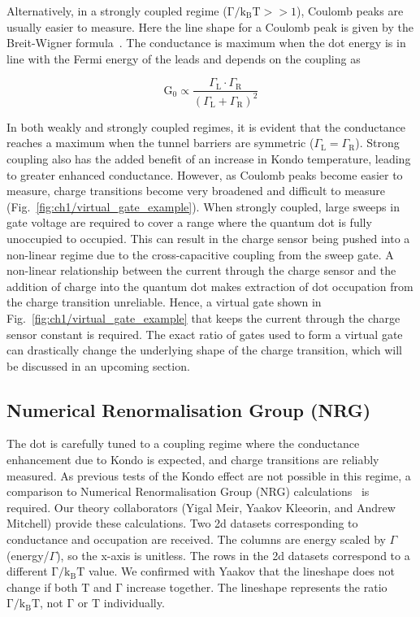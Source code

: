 Alternatively, in a strongly coupled regime ($\mathrm{\Gamma/k_BT}>>1$), Coulomb peaks are usually easier to measure. Here the line shape for a Coulomb peak is given by the Breit-Wigner formula~\cite{Breit1936}. The conductance is maximum when the dot energy is in line with the Fermi energy of the leads and depends on the coupling as 

\begin{equation}\label{eq:cond_amp_strong}
 \mathrm{G_0} \propto
 \frac{\Gamma_\mathrm{L}\cdot\Gamma_\mathrm{R}}{\left(\Gamma_\mathrm{L}+\Gamma_\mathrm{R}\right)^2}
\end{equation}

\noindent In both weakly and strongly coupled regimes, it is evident that the conductance reaches a maximum when the tunnel barriers are symmetric ($\Gamma_\mathrm{L}=\Gamma_\mathrm{R}$). Strong coupling also has the added benefit of an increase in Kondo temperature, leading to greater enhanced conductance. 
However, as Coulomb peaks become easier to measure, charge transitions become very broadened and difficult to measure (Fig.~\ref{fig:ch1/virtual_gate_example}). When strongly coupled, large sweeps in gate voltage are required to cover a range where the quantum dot is fully unoccupied to occupied. This can result in the charge sensor being pushed into a non-linear regime due to the cross-capacitive coupling from the sweep gate.
A non-linear relationship between the current through the charge sensor and the addition of charge into the quantum dot makes extraction of dot occupation from the charge transition unreliable. Hence, a virtual gate shown in Fig.~\ref{fig:ch1/virtual_gate_example} that keeps the current through the charge sensor constant is required. The exact ratio of gates used to form a virtual gate can drastically change the underlying shape of the charge transition, which will be discussed in an upcoming section. 


\subsection{Numerical Renormalisation Group (NRG)}
The dot is carefully tuned to a coupling regime where the conductance enhancement due to Kondo is expected, and charge transitions are reliably measured. As previous tests of the Kondo effect are not possible in this regime, a comparison to Numerical Renormalisation Group (NRG) calculations~\cite{nrg} is required. Our theory collaborators (Yigal Meir, Yaakov Kleeorin, and Andrew Mitchell) provide these calculations. 
Two 2d datasets corresponding to conductance and occupation are received.  The columns are energy scaled by $\Gamma$ (energy/$\Gamma$), so the x-axis is unitless. The rows in the 2d datasets correspond to a different $\mathrm{\Gamma/k_BT}$ value. We confirmed with Yaakov that the lineshape does not change if both $\mathrm{T}$ and $\mathrm{\Gamma}$ increase together. The lineshape represents the ratio $\mathrm{\Gamma/k_BT}$, not $\mathrm{\Gamma}$ or $\mathrm{T}$ individually.

